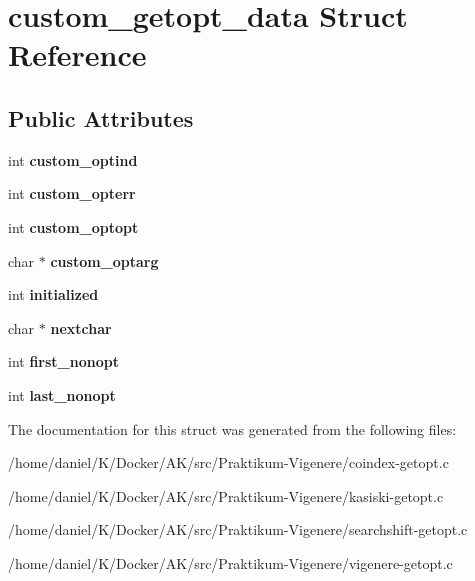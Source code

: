 \hypertarget{structcustom__getopt__data}{}\section{custom\+\_\+getopt\+\_\+data Struct Reference}
\label{structcustom__getopt__data}
\subsection*{Public Attributes}
\begin{DoxyCompactItemize}
\item 
\mbox{\label{structcustom__getopt__data_a708838699338a902634d6040f61c9d1e}} 
int {\bfseries custom\+\_\+optind}
\item 
\mbox{\label{structcustom__getopt__data_a70368029b9189c6af100d41b95a2a853}} 
int {\bfseries custom\+\_\+opterr}
\item 
\mbox{\label{structcustom__getopt__data_ad986661b4b79755fd55f9f10303221e0}} 
int {\bfseries custom\+\_\+optopt}
\item 
\mbox{\label{structcustom__getopt__data_a90b1d05e3f28ba8fedf67efcdc7397af}} 
char $\ast$ {\bfseries custom\+\_\+optarg}
\item 
\mbox{\label{structcustom__getopt__data_a5952791becb49374ddfc8726bbf94910}} 
int {\bfseries initialized}
\item 
\mbox{\label{structcustom__getopt__data_aae9bcb1e923ebc360e9ae61c4b8908be}} 
char $\ast$ {\bfseries nextchar}
\item 
\mbox{\label{structcustom__getopt__data_a89f56362160b74f59aa39d8838dd8bb8}} 
int {\bfseries first\+\_\+nonopt}
\item 
\mbox{\label{structcustom__getopt__data_aff78193409ca6ea017ced550453e0cfd}} 
int {\bfseries last\+\_\+nonopt}
\end{DoxyCompactItemize}


The documentation for this struct was generated from the following files\+:\begin{DoxyCompactItemize}
\item 
/home/daniel/\+K/\+Docker/\+A\+K/src/\+Praktikum-\/\+Vigenere/coindex-\/getopt.\+c\item 
/home/daniel/\+K/\+Docker/\+A\+K/src/\+Praktikum-\/\+Vigenere/kasiski-\/getopt.\+c\item 
/home/daniel/\+K/\+Docker/\+A\+K/src/\+Praktikum-\/\+Vigenere/searchshift-\/getopt.\+c\item 
/home/daniel/\+K/\+Docker/\+A\+K/src/\+Praktikum-\/\+Vigenere/vigenere-\/getopt.\+c\end{DoxyCompactItemize}
